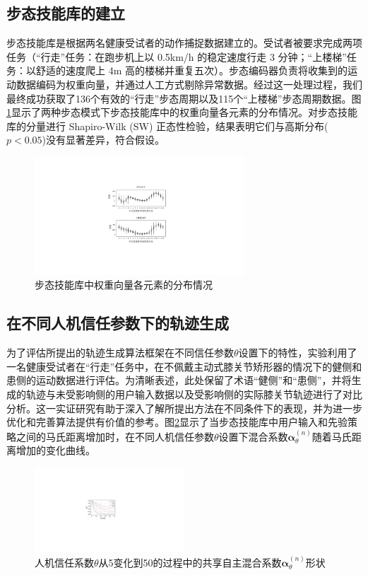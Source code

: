 \subsection{步态技能库的建立}步态技能库是根据两名健康受试者的动作捕捉数据建立的。受试者被要求完成两项任务（``行走''任务：在跑步机上以 0.5km/h 的稳定速度行走 3 分钟；``上楼梯''任务：以舒适的速度爬上 4m 高的楼梯并重复五次）。步态编码器负责将收集到的运动数据编码为权重向量，并通过人工方式剔除异常数据。经过这一处理过程，我们最终成功获取了136个有效的``行走''步态周期以及115个``上楼梯''步态周期数据。图\ref{fig:5-3}显示了两种步态模式下步态技能库中的权重向量各元素的分布情况。对步态技能库的分量进行 Shapiro-Wilk (SW) 正态性检验，结果表明它们与高斯分布($p<0.05$)没有显著差异，符合假设。
\begin{figure}[htb]
  \centering\includegraphics[width=0.7\textwidth]{figures/5-Fig-3.pdf}
  \caption{步态技能库中权重向量各元素的分布情况}
  \label{fig:5-3}
\end{figure}

\subsection{在不同人机信任参数下的轨迹生成}
为了评估所提出的轨迹生成算法框架在不同信任参数$\theta $设置下的特性，实验利用了一名健康受试者在``行走''任务中，在不佩戴主动式膝关节矫形器的情况下的健侧和患侧的运动数据进行评估。为清晰表述，此处保留了术语``健侧''和``患侧''，并将生成的轨迹与未受影响侧的用户输入数据以及受影响侧的实际膝关节轨迹进行了对比分析。这一实证研究有助于深入了解所提出方法在不同条件下的表现，并为进一步优化和完善算法提供有价值的参考。图\ref{fig:5-4}显示了当步态技能库中用户输入和先验策略之间的马氏距离增加时，在不同人机信任参数$\theta $设置下混合系数$\pmb{\alpha }_\theta ^{(n)}$随着马氏距离增加的变化曲线。
\begin{figure}[htb]
  \centering\includegraphics[width=0.5\textwidth]{figures/5-Fig-4.pdf}
  \caption{人机信任系数$\theta $从5变化到50的过程中的共享自主混合系数$\pmb{\alpha }_\theta ^{(n)}$形状}
  \label{fig:5-4}
\end{figure}

